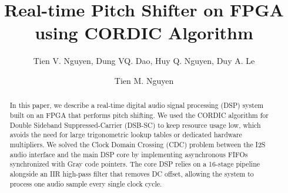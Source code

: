 \documentclass[runningheads]{llncs}
\begin{document}
\title{Real-time Pitch Shifter on FPGA using CORDIC Algorithm}
\author{Tien V. Nguyen, Dung VQ. Dao, Huy Q. Nguyen, Duy A. Le \and Tien M. Nguyen}
\maketitle
\begin{abstract}
In this paper, we describe a real-time digital audio signal processing (DSP) system built on an FPGA that performs pitch shifting. We used the CORDIC algorithm for Double Sideband Suppressed-Carrier (DSB-SC) to keep resource usage low, which avoids the need for large trigonometric lookup tables or dedicated hardware multipliers. We solved the Clock Domain Crossing (CDC) problem between the I2S audio interface and the main DSP core by implementing asynchronous FIFOs synchronized with Gray code pointers. The core DSP relies on a 16-stage pipeline alongside an IIR high-pass filter that removes DC offset, allowing the system to process one audio sample every single clock cycle.
\end{abstract}
\end{document}

